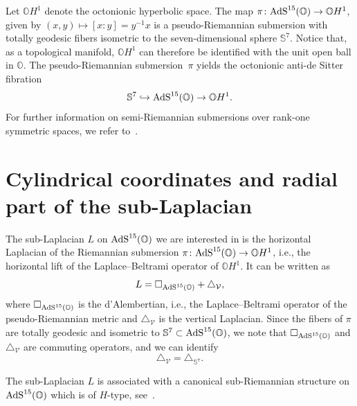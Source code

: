 \documentclass[10pt,a4paper]{amsart}
\numberwithin{equation}{section}
\begin{document}
Let $\mathbb{O}H^1$ denote the octonionic hyperbolic space. The map $\pi\colon {\rm AdS}^{15}(\mathbb{O}) \rightarrow \mathbb{O}H^1$, given by $(x,y) \mapsto [x:y]=y^{-1}x$ is a pseudo-Riemannian submersion with totally geodesic fibers isometric to the seven-dimensional sphere $\mathbb S^7$. Notice that, as a topological manifold, $\mathbb{O}H^1$ can therefore be identified with the unit open ball in $\mathbb{O}$. The pseudo-Riemannian submersion~$\pi$ yields the octonionic anti-de Sitter fibration
\begin{equation*}
\mathbb{S}^7 \hookrightarrow {\rm AdS}^{15}(\mathbb{O}) \rightarrow \mathbb{O}H^1.
\end{equation*}
For further information on semi-Riemannian submersions over rank-one symmetric spaces, we refer to~\cite{MR1877586}.

\section{Cylindrical coordinates and radial part of the sub-Laplacian}\label{section3}

The sub-Laplacian $L$ on ${\rm AdS}^{15}(\mathbb{O})$ we are interested in is the horizontal Laplacian of the Riemannian submersion $\pi\colon {\rm AdS}^{15}(\mathbb{O}) \to \mathbb{O}H^1$, i.e., the horizontal lift of the Laplace--Beltrami operator of $\mathbb{O}H^1$. It can be written as
\begin{equation}\label{eq:sub_Laplacian}
L=\square_{{\rm AdS}^{15}(\mathbb{O})}+\triangle_\mathcal{V},
\end{equation}
where $\square_{{\rm AdS}^{15}(\mathbb{O})}$ is the d'Alembertian, i.e., the Laplace--Beltrami operator of the pseudo-Rie\-man\-nian metric and $\triangle_\mathcal{V}$ is the vertical Laplacian. Since the fibers of $\pi$ are totally geodesic and isometric to $\mathbb{S}^7\subset {\rm AdS}^{15}(\mathbb{O})$, we note that $\square_{{\rm AdS}^{15}(\mathbb{O})}$ and $\triangle_\mathcal{V}$ are commuting operators, and we can identify
\begin{equation}\label{eq:vertical_Laplacian}
\triangle_\mathcal{V}={\triangle}_{\mathbb{S}^{7}}.
\end{equation}

The sub-Laplacian $L$ is associated with a canonical sub-Riemannian structure on ${\rm AdS}^{15}(\mathbb{O})$ which is of $H$-type, see~\cite{BGMR}.
\end{document}
